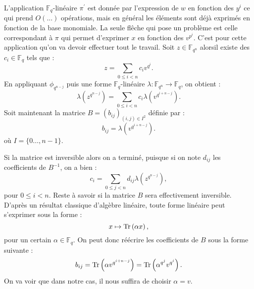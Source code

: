 \documentclass[a4paper]{article} %
\numberwithin{section}{part}
\numberwithin{equation}{section}
\newcommand\GF[1]{\mathbb{F}_{#1}}
\newcommand\Tr[1]{\textup{Tr}\left(#1\right)}
\begin{document}
L'application $\GF{q}$-linéaire $\pi^{\prime}$ est donnée par l'expression de 
$w$ en fonction des $y^i$ ce qui prend $O(...)$ opérations, mais en général les 
éléments sont déjà exprimés en fonction de la base monomiale. La seule flêche 
qui pose un problème est celle correspondant à $\pi$ qui permet d'exprimer $x$ 
en fonction des $v^{p^i}$. C'est pour cette application qu'on va devoir 
effectuer tout le travail. Soit $z\in\GF{q^n}$ alorsil existe des $c_i\in\GF{q}$
tels que :
\begin{equation}
z = \sum_{0 \leq i < n}{c_iv^{q^i}}.
\end{equation}
En appliquant $\phi_{q^{n-j}}$ puis une forme $\GF{q}$-linéaire $\lambda
: \GF{q^n} \to \GF{q}$, on obtient :
\begin{equation}
\lambda\left(z^{q^{n-j}}\right) = \sum_{0\leq i < n}
{c_i\lambda\left(v^{q^{i+n-j}}\right)}.
\end{equation}
Soit maintenant la matrice $B = (b_{ij})_{(i,j)\in I^2}$ définie par :
\begin{equation}
b_{ij} = \lambda\left(v^{q^{i+n-j}}\right).
\end{equation}
où $I = \lbrace{0\dots,n-1}\rbrace$.\par
Si la matrice est inversible alors on a terminé, puisque si on note $d_{ij}$ les
coefficients de $B^{-1}$, on a bien :
\begin{equation}
c_i = \sum_{0\leq j < n}{d_{ij}\lambda\left(z^{q^{n-j}}\right)},
\end{equation}
pour $0\leq i < n$. Reste à savoir si la matrice $B$ sera effectivement 
inversible.
D'après un résultat classique d'algèbre linéaire, toute forme linéaire peut
s'exprimer sous la forme :
\begin{equation}
x \mapsto \Tr{\alpha x},
\end{equation}
pour un certain $\alpha\in\GF{q}$. On peut donc réécrire les coefficients de $B$
sous la forme suivante :
\begin{equation}
b_{ij} = \Tr{\alpha v^{q^{i+n-j}}} = \Tr{\alpha^{q^j}v^{q^i}}.
\end{equation}
On va voir que dans notre cas, il nous suffira de choisir $\alpha = v$.
\end{document}
